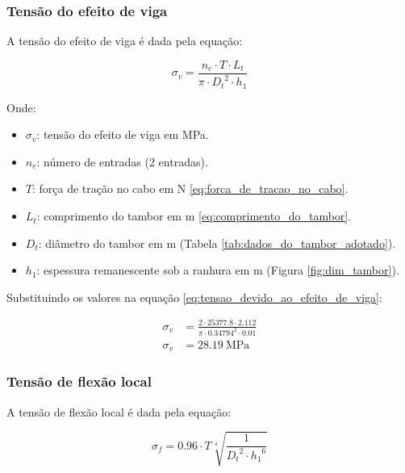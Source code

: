 \subsubsection{Tensão do efeito de viga}

A tensão do efeito de viga é dada pela equação:

\begin{equation}
  \sigma_v = \frac{n_e \cdot T \cdot L_t}{\pi \cdot {D_t}^2 \cdot h_1}
  \label{eq:tensao_devido_ao_efeito_de_viga}
\end{equation}

Onde:

\begin{itemize}
  \item $\sigma_v$: tensão do efeito de viga em \si{\mega\pascal}.
  \item $n_e$: número de entradas (2 entradas).
  \item $T$: força de tração no cabo em \si{\newton} \eqref{eq:forca_de_tracao_no_cabo}.
  \item $L_t$: comprimento do tambor em \si{\meter} \eqref{eq:comprimento_do_tambor}.
  \item $D_t$: diâmetro do tambor em \si{\meter} (Tabela \ref{tab:dados_do_tambor_adotado}).
  \item $h_1$: espessura remanescente sob a ranhura em \si{\meter} (Figura \ref{fig:dim_tambor}).
\end{itemize}

\vspace{1em}

Substituindo os valores na equação \eqref{eq:tensao_devido_ao_efeito_de_viga}:

\begin{align*}
  \sigma_v & = \frac{2 \cdot \num{25377.8} \cdot \num{2.112}}{\pi \cdot \num{0.34794}^2 \cdot \num{0.01}} \\
  \sigma_v & = \boxed{\SI{28.19}{\mega\pascal}}
\end{align*}

\subsubsection{Tensão de flexão local}

A tensão de flexão local é dada pela equação:

\begin{equation}
  \sigma_f = \num{0.96} \cdot T \sqrt[4]{\frac{1}{{D_t}^2 \cdot {h_1}^6}}
  \label{eq:tensao_de_flexao_local}
\end{equation}

